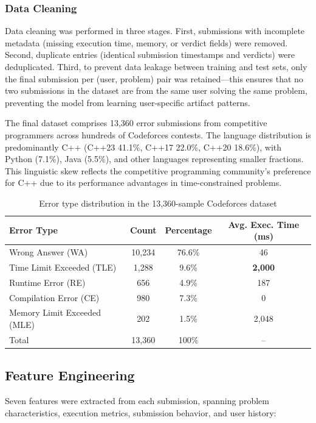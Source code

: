 \documentclass[10pt,a4paper]{article}
\begin{document}
\subsubsection*{Data Cleaning}
Data cleaning was performed in three stages. First, submissions with
incomplete metadata (missing execution time, memory, or verdict fields) were
removed. Second, duplicate entries (identical submission timestamps and
verdicts) were deduplicated. Third, to prevent data leakage between training
and test sets, only the final submission per (user, problem) pair was
retained---this ensures that no two submissions in the dataset are from the
same user solving the same problem, preventing the model from learning
user-specific artifact patterns.

The final dataset comprises 13,360 error submissions from competitive programmers
across hundreds of Codeforces contests. The language distribution
is predominantly C++ (C++23 41.1\%, C++17 22.0\%, C++20 18.6\%), with Python (7.1\%), Java (5.5\%), and other languages representing smaller fractions. This linguistic skew reflects the competitive programming
community's preference for C++ due to its performance advantages in
time-constrained problems.

\begin{table}[htbp]
\centering
\caption{Error type distribution in the 13,360-sample Codeforces dataset}
\label{tab:error-dist}
\begin{tabular}{@{}lccc@{}}
\toprule
Error Type & Count & Percentage & Avg. Exec. Time (ms) \\
\midrule
Wrong Answer (WA)           & 10,234 & 76.6\% & 46 \\
Time Limit Exceeded (TLE)   & 1,288  & 9.6\% & \textbf{2,000} \\
Runtime Error (RE)          & 656  & 4.9\%  & 187 \\
Compilation Error (CE)      & 980  & 7.3\%  & 0 \\
Memory Limit Exceeded (MLE) & 202    & 1.5\%  & 2,048 \\
\midrule
Total                       & 13,360 & 100\% & -- \\
\bottomrule
\end{tabular}
\end{table}

\subsection{Feature Engineering}

Seven features were extracted from each submission, spanning problem
characteristics, execution metrics, submission behavior, and user history:
\end{document}

